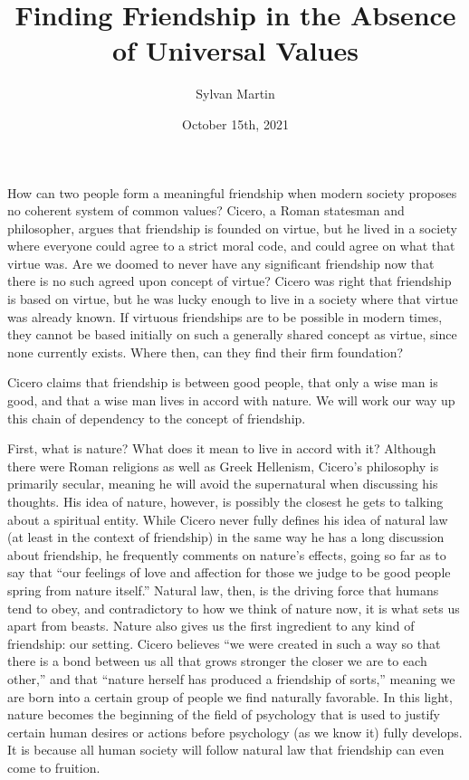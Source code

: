\documentclass[12pt, letterpaper]{article}
\title{Finding Friendship in the Absence of Universal Values}
\author{Sylvan Martin}
\date{October 15th, 2021}
\begin{document}
\maketitle
\newpage

How can two people form a meaningful friendship when modern society proposes no coherent system of common values? 
Cicero, a Roman statesman and philosopher, argues that friendship is founded on virtue, but he lived in a 
society where everyone could agree to a strict moral code, and could agree on what that virtue was. Are we 
doomed to never have any significant friendship now that there is no such agreed upon concept of virtue? 
Cicero was right that friendship is based on virtue, but he was lucky enough to live in a society where that 
virtue was already known. If virtuous friendships are to be possible in modern times, they cannot be based 
initially on such a generally shared concept as virtue, since none currently exists. Where then, can they 
find their firm foundation?

Cicero claims that friendship is between good people, that only a wise man is good, and that a wise man lives 
in accord with nature.\cite[sec. 18]{cicero} We will work our way up this chain of dependency to the concept of friendship.

First, what is nature? What does it mean to live in accord with it? Although there were Roman religions as 
well as Greek Hellenism, Cicero’s philosophy is primarily secular, meaning he will avoid the supernatural when
discussing his thoughts. His idea of nature, however, is possibly 
the closest he gets to talking about a spiritual entity. While Cicero never fully defines his idea of natural 
law (at least in the context of friendship) in the same way he has a long discussion about friendship, he frequently comments on nature’s effects, 
going so far as to say that “our feelings of love and affection for those we judge to be good people spring 
from nature itself.”\cite[sec. 32]{cicero} Natural law, then, is the driving force that humans tend to obey, and contradictory to 
how we think of nature now, it is what sets us apart from beasts. Nature also gives us the first ingredient to any kind of 
friendship: our setting. Cicero believes “we were created in such a way so that there is a bond between us 
all that grows stronger the closer we are to each other,'' and that “nature herself has produced a friendship 
of sorts,”\cite[sec. 19]{cicero} meaning we are born into a certain group of people we find naturally favorable. In this light, 
nature becomes the beginning of the field of psychology that is used to justify certain human desires or actions 
before psychology (as we know it) fully develops. It is because all human society will follow natural law that 
friendship can even come to fruition.
\end{document}
